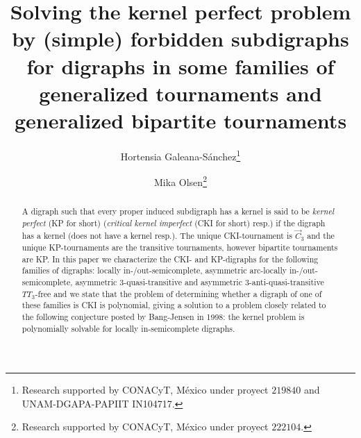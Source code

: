 \author{Hortensia Galeana-S\'{a}nchez\thanks{Research supported by CONACyT, M\'exico under proyect $219840$ and UNAM-DGAPA-PAPIIT IN104717.}
  \and Mika Olsen\thanks{Research supported by CONACyT, M\'exico under proyect $222104$.}}
\title[Solving the kernel perfect problem for digraphs in some families of generalized tournaments]{Solving the kernel perfect problem by (simple) forbidden subdigraphs for digraphs in some families of generalized tournaments and generalized bipartite tournaments}

\maketitle
\begin{abstract}
A digraph such that every proper induced subdigraph has a kernel is said to be \emph{kernel perfect} (KP for short) (\emph{critical kernel imperfect} (CKI for short) resp.) if the digraph has  a kernel (does not have a kernel resp.).
%
The unique CKI-tournament is $\overrightarrow{C}_3$ and the unique KP-tournaments are the transitive tournaments, however bipartite tournaments are KP. 
%
In this paper we characterize the CKI- and KP-digraphs for the following families of digraphs: locally in-/out-semicomplete, asymmetric arc-locally in-/out-semicomplete, asymmetric $3$-quasi-transitive and asymmetric $3$-anti-quasi-transitive $TT_3$-free and we state that the problem of determining whether a digraph of one of these families is CKI is polynomial, giving a solution to a problem closely related to the following conjecture posted by Bang-Jensen in 1998: the kernel problem is polynomially solvable for locally in-semicomplete digraphs. 
\end{abstract}


